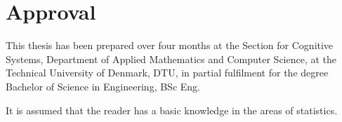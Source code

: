 \section*{Approval}
This thesis has been prepared over four months at the Section for Cognitive Systems, Department of Applied Mathematics and Computer Science, at the Technical University of Denmark, DTU, in partial fulfilment for the degree Bachelor of Science in Engineering, BSc Eng. 

It is assumed that the reader has a basic knowledge in the areas of statistics. 

\vfill

\begin{center}
\namesigdate{\thesisauthor~-~\studentnumber}
\end{center}

\vfill

